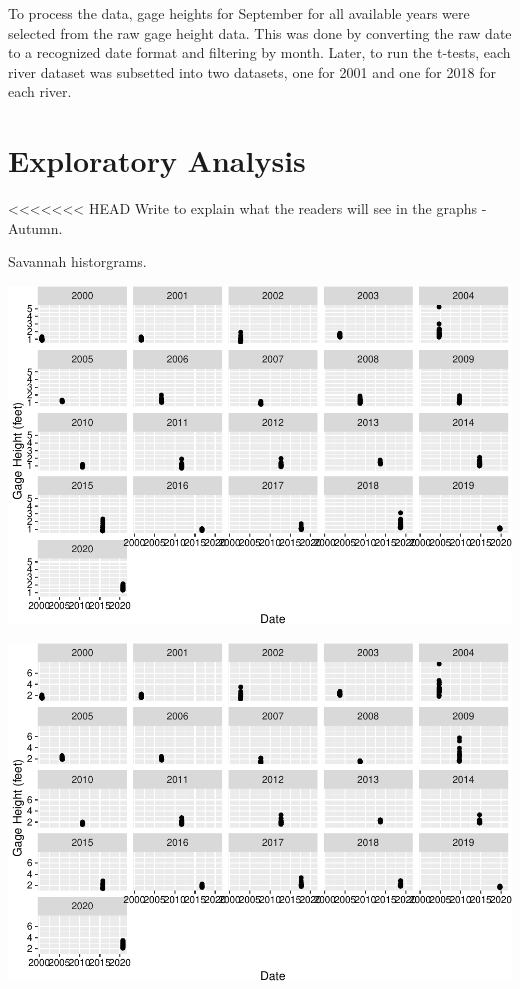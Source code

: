 \documentclass[
  12pt,
]{article}
\begin{document}
To process the data, gage heights for September for all available years
were selected from the raw gage height data. This was done by converting
the raw date to a recognized date format and filtering by month. Later,
to run the t-tests, each river dataset was subsetted into two datasets,
one for 2001 and one for 2018 for each river.

\newpage

\hypertarget{exploratory-analysis}{%
\section{Exploratory Analysis}\label{exploratory-analysis}}

<<<<<<< HEAD
Write to explain what the readers will see in the graphs - Autumn.

Savannah historgrams.

\includegraphics{Project_Template_files/figure-latex/Plot1-1.pdf}

\includegraphics{Project_Template_files/figure-latex/Plot2-1.pdf}
\end{document}
